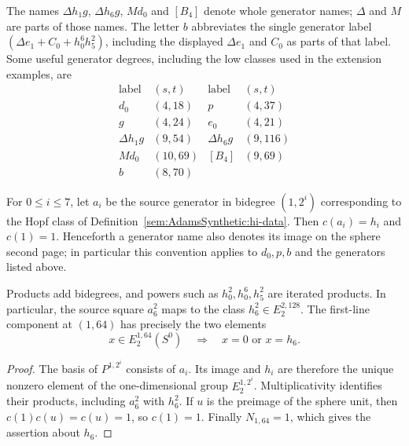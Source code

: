 The names $\Delta h_1g$, $\Delta h_6g$, $Md_0$ and $[B_4]$ denote whole
generator names; $\Delta$ and $M$ are parts of those names. The letter
$b$ abbreviates the single generator label $(\Delta e_1+C_0+h_0^6h_5^2)$,
including the displayed $\Delta e_1$ and $C_0$ as parts of that label.
Some useful generator degrees, including the low classes used in the
extension examples, are
\[
\begin{array}{c|c|c|c}
\text{label}&(s,t)&\text{label}&(s,t)\\\hline
d_0&(4,18)&p&(4,37)\\
g&(4,24)&e_0&(4,21)\\
\Delta h_1g&(9,54)&\Delta h_6g&(9,116)\\
Md_0&(10,69)&[B_4]&(9,69)\\
b&(8,70)&&
\end{array}
\]
\begin{theorem}
\label{sem:Computation:standard-atoms}
\label{sem:Computation:h6-square-calibration}
\label{sem:Computation:h6-line}
For $0\le i\le7$, let $a_i$ be the source generator in bidegree
$(1,2^i)$ corresponding to the Hopf class of
Definition~\ref{sem:AdamsSynthetic:hi-data}. Then
$c(a_i)=h_i$ and $c(1)=1$. Henceforth a generator name also denotes its
image on the sphere second page; in particular this convention applies
to $d_0,p,b$ and the generators listed above.

Products add bidegrees, and powers such as $h_0^2,h_0^6,h_5^2$ are
iterated products. In particular, the source square $a_6^2$ maps to the
class $h_6^2\in E_2^{2,128}$. The first-line component at $(1,64)$
has precisely the two elements
\[
 x\in E_2^{1,64}(S^0)\quad\Longrightarrow\quad x=0\text{ or }x=h_6.
\]
\end{theorem}
\begin{proof}
The basis of $P^{1,2^i}$ consists of $a_i$. Its image and $h_i$ are
therefore the unique nonzero element of the one-dimensional group
$E_2^{1,2^i}$. Multiplicativity identifies their products, including
$a_6^2$ with $h_6^2$. If $u$ is the preimage of the sphere unit, then
$c(1)c(u)=c(u)=1$, so $c(1)=1$. Finally $N_{1,64}=1$, which gives the
assertion about $h_6$.
\end{proof}

